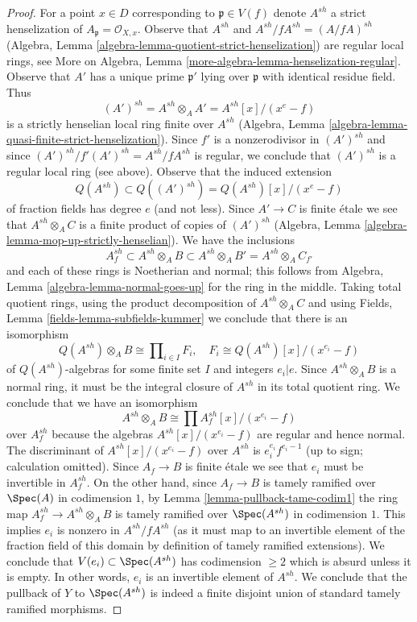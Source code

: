 \begin{proof}
\medskip\noindent
For a point $x \in D$ corresponding to $\mathfrak p \in V(f)$
denote $A^{sh}$ a strict henselization of $A_\mathfrak p = \mathcal{O}_{X, x}$.
Observe that $A^{sh}$ and $A^{sh}/fA^{sh} = (A/fA)^{sh}$
(Algebra, Lemma \ref{algebra-lemma-quotient-strict-henselization})
are regular local rings, see
More on Algebra, Lemma \ref{more-algebra-lemma-henselization-regular}.
Observe that $A'$ has a unique prime $\mathfrak p'$ lying over
$\mathfrak p$ with identical residue field. Thus
$$
(A')^{sh} = A^{sh} \otimes_A A' = A^{sh}[x]/(x^e - f)
$$
is a strictly henselian local ring finite over $A^{sh}$
(Algebra, Lemma \ref{algebra-lemma-quasi-finite-strict-henselization}).
Since $f'$ is a nonzerodivisor in $(A')^{sh}$ and since
$(A')^{sh}/f'(A')^{sh} = A^{sh}/fA^{sh}$ is regular, we conclude
that $(A')^{sh}$ is a regular local ring (see above).
Observe that the induced extension
$$
Q(A^{sh}) \subset Q((A')^{sh}) = Q(A^{sh})[x]/(x^e - f)
$$
of fraction fields has degree $e$ (and not less).
Since $A' \to C$ is finite \'etale we see that
$A^{sh} \otimes_A C$ is a finite product of copies of $(A')^{sh}$
(Algebra, Lemma \ref{algebra-lemma-mop-up-strictly-henselian}).
We have the inclusions
$$
A^{sh}_f \subset
A^{sh} \otimes_A B \subset
A^{sh} \otimes_A B' = A^{sh} \otimes_A C_{f'}
$$
and each of these rings is Noetherian and normal; this follows from
Algebra, Lemma \ref{algebra-lemma-normal-goes-up} for the ring
in the middle. Taking total quotient rings, using the product
decomposition of $A^{sh} \otimes_A C$ and using
Fields, Lemma \ref{fields-lemma-subfields-kummer} we conclude that
there is an isomorphism
$$
Q(A^{sh}) \otimes_A B \cong \prod\nolimits_{i \in I} F_i,\quad
F_i \cong Q(A^{sh})[x]/(x^{e_i} - f)
$$
of $Q(A^{sh})$-algebras for some finite set $I$ and integers $e_i | e$.
Since $A^{sh} \otimes_A B$ is a normal ring, it must be the
integral closure of $A^{sh}$ in its total quotient ring.
We conclude that we have an isomorphism
$$
A^{sh} \otimes_A B \cong \prod A^{sh}_f[x]/(x^{e_i} - f)
$$
over $A^{sh}_f$ because the algebras $A^{sh}[x]/(x^{e_i} - f)$
are regular and hence normal. The discriminant of
$A^{sh}[x]/(x^{e_i} - f)$ over $A^{sh}$ is $e_i^{e_i}f^{e_i - 1}$
(up to sign; calculation omitted). Since $A_f \to B$ is finite
\'etale we see that $e_i$ must be invertible in $A^{sh}_f$.
On the other hand, since $A_f \to B$ is tamely ramified
over $\Spec(A)$ in codimension $1$, by Lemma \ref{lemma-pullback-tame-codim1}
the ring map $A^{sh}_f \to A^{sh} \otimes_A B$
is tamely ramified over $\Spec(A^{sh})$ in codimension $1$.
This implies $e_i$ is nonzero in $A^{sh}/fA^{sh}$
(as it must map to an invertible element of the fraction field of
this domain by definition of tamely ramified extensions).
We conclude that $V(e_i) \subset \Spec(A^{sh})$
has codimension $\geq 2$ which is absurd unless it is empty.
In other words, $e_i$ is an invertible element of $A^{sh}$.
We conclude that the pullback of $Y$ to $\Spec(A^{sh})$
is indeed a finite disjoint union of standard tamely ramified morphisms.


\end{proof}
